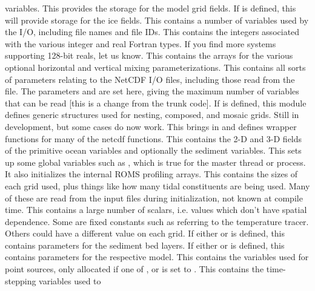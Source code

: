 \begin{klist}
    variables.
   This provides the storage for the model grid fields. 
   If  is defined, this will provide
    storage for the ice fields.
   This contains a number of variables used by the
    I/O, including file names and file IDs.
    This contains the integers associated with the
    various integer and real Fortran types. If you find more systems
    supporting 128-bit reals, let us know.
   This contains the arrays for the various
    optional horizontal and vertical mixing parameterizations.
   This contains all sorts of parameters relating to
    the NetCDF I/O files, including those read from the 
    file. The parameters  and  are set here, giving
    the maximum number of variables that can be read [this is a change
    from the trunk code].
   If  is defined, this module defines
    generic structures used for nesting, composed, and mosaic grids.
    Still in development, but some cases do now work.
   This brings in  and defines
    wrapper functions for many of the netcdf functions.
   This contains the 2-D and 3-D fields of the primitive
    ocean variables and optionally the sediment variables.
   This sets up some global variables such as
    , which is true for the master thread or
    process. It also initializes the internal ROMS profiling arrays.
   This contains the sizes of each grid used, plus
    things like how many tidal constituents are being used. Many of these are
    read from the input files during initialization, not known at compile
    time.
   This contains a large number of scalars, i.e. values
    which don't have spatial dependence. Some are fixed constants such
    as  referring to the temperature tracer. Others could
    have a different value on each grid.
   If either  or 
    is defined, this contains parameters for the sediment bed layers.
   If either  or 
    is defined, this contains parameters for the respective model.
   This contains the variables used for point
    sources, only allocated if one of , 
    or  is set to .
   This contains the time-stepping variables used to

\end{klist}
